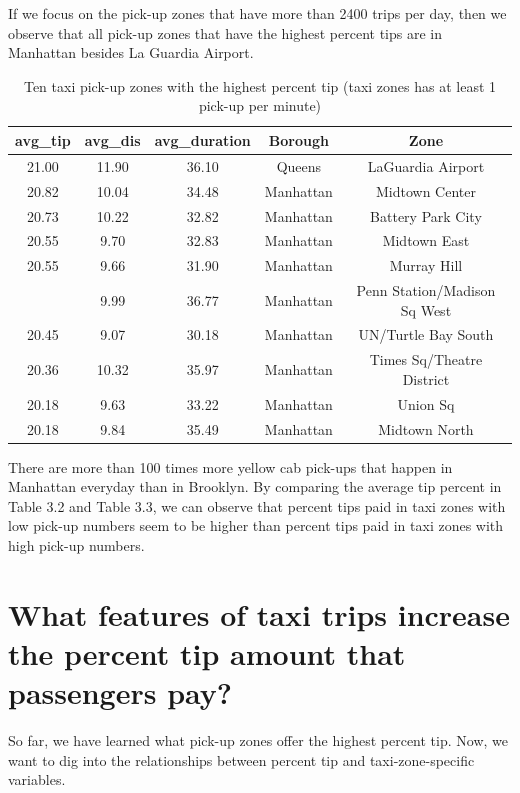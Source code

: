 \documentclass[12pt,twoside]{reedthesis}
\theoremstyle{definition}
\theoremstyle{definition}
\theoremstyle{definition}
\theoremstyle{remark}
\begin{document}
If we focus on the pick-up zones that have more than 2400 trips per day,
then we observe that all pick-up zones that have the highest percent
tips are in Manhattan besides La Guardia Airport.
\begin{table}

\caption{\label{tab:unnamed-chunk-48}Ten taxi pick-up zones with the highest percent tip (taxi zones has at least 1 pick-up per minute)}
\centering
\begin{tabular}[t]{ccccc}
\toprule
avg\_tip & avg\_dis & avg\_duration & Borough & Zone\\
\midrule
21.00 & 11.90 & 36.10 & Queens & LaGuardia Airport\\
20.82 & 10.04 & 34.48 & Manhattan & Midtown Center\\
20.73 & 10.22 & 32.82 & Manhattan & Battery Park City\\
20.55 & 9.70 & 32.83 & Manhattan & Midtown East\\
20.55 & 9.66 & 31.90 & Manhattan & Murray Hill\\
\addlinespace
20.55 & 9.99 & 36.77 & Manhattan & Penn Station/Madison Sq West\\
20.45 & 9.07 & 30.18 & Manhattan & UN/Turtle Bay South\\
20.36 & 10.32 & 35.97 & Manhattan & Times Sq/Theatre District\\
20.18 & 9.63 & 33.22 & Manhattan & Union Sq\\
20.18 & 9.84 & 35.49 & Manhattan & Midtown North\\
\bottomrule
\end{tabular}
\end{table}
There are more than 100 times more yellow cab pick-ups that happen in
Manhattan everyday than in Brooklyn. By comparing the average tip
percent in Table 3.2 and Table 3.3, we can observe that percent tips
paid in taxi zones with low pick-up numbers seem to be higher than
percent tips paid in taxi zones with high pick-up numbers.

\section{What features of taxi trips increase the percent tip amount
that passengers
pay?}\label{what-features-of-taxi-trips-increase-the-percent-tip-amount-that-passengers-pay}

So far, we have learned what pick-up zones offer the highest percent
tip. Now, we want to dig into the relationships between percent tip and
taxi-zone-specific variables.
\end{document}
